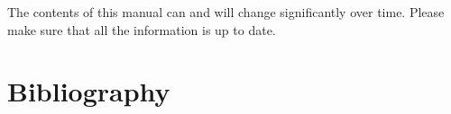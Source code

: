 \documentclass[11pt,fleqn,a4paper]{book} %
\begin{document}
  \noindent The contents of this manual can and will change significantly over time.  Please make sure that all the information is up to date.

  \pagestyle{empty} %
  \tableofcontents %
  \cleardoublepage %
  \pagestyle{fancy} %

\setlength{\parindent}{0pt}
\setlength{\parskip}{5pt}









\chapter*{Bibliography}

%
%
\printbibliography[heading=bibempty]
\end{document}
